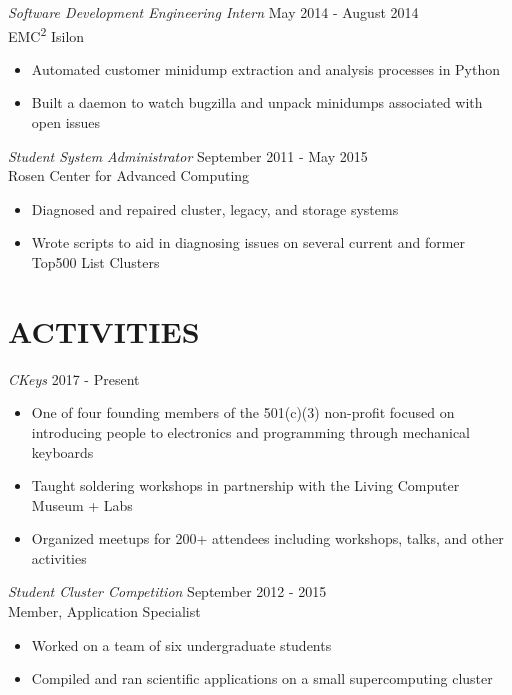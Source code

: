 \documentclass[line,margin]{res}
\begin{document}
\begin{resume}
    {\sl Software Development Engineering Intern} \hfill May 2014 - August 2014 \\
      EMC\textsuperscript{2} Isilon
      \begin{itemize}  \itemsep -2pt
        \item Automated customer minidump extraction and analysis processes in Python
        \item Built a daemon to watch bugzilla and unpack minidumps associated with open issues
      \end{itemize}

    {\sl Student System Administrator} \hfill September 2011 - May 2015 \\
      Rosen Center for Advanced Computing
      \begin{itemize}  \itemsep -2pt %
        \item Diagnosed and repaired cluster, legacy, and storage systems
        \item Wrote scripts to aid in diagnosing issues on several current and former Top500 List Clusters
      \end{itemize}

  \section{\textcolor{TealBlue}{ACTIVITIES}}
    {\sl CKeys} \hfill 2017 - Present
      \begin{itemize}  \itemsep -2pt %
        \item One of four founding members of the 501(c)(3) non-profit focused on introducing people to electronics and programming through mechanical keyboards
        \item Taught soldering workshops in partnership with the Living Computer Museum + Labs
        \item Organized meetups for 200+ attendees including workshops, talks, and other activities
      \end{itemize}

    {\sl Student Cluster Competition} \hfill September 2012 - 2015 \\
      Member, Application Specialist
      \begin{itemize}  \itemsep -2pt %
        \item Worked on a team of six undergraduate students
        \item Compiled and ran scientific applications on a small supercomputing cluster
      \end{itemize}
  

\end{resume}
\end{document}
